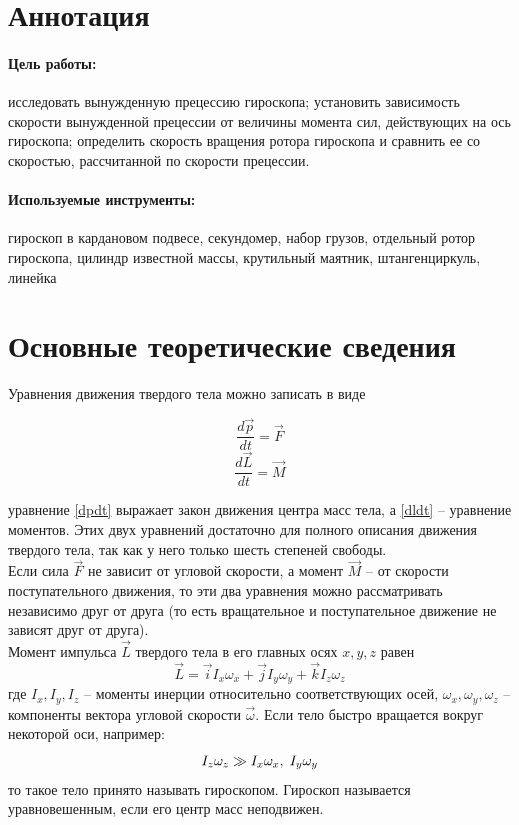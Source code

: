 \documentclass[a4paper,12pt]{article}
\begin{document}
	
	\newpage
	
	\section{Аннотация}
	\paragraph{Цель работы:} \hspace{-4mm} 
	исследовать вынужденную прецессию гироскопа; установить зависимость скорости вынужденной прецессии от величины момента сил, действующих на ось гироскопа; определить скорость вращения ротора гироскопа и сравнить ее со скоростью, рассчитанной по скорости прецессии.
	\paragraph{Используемые инструменты:} \hspace{-4mm} гироскоп в кардановом подвесе, секундомер, набор грузов, отдельный ротор гироскопа, цилиндр известной массы, крутильный маятник, штангенциркуль, линейка\\
	\section{Основные теоретические сведения}
	Уравнения движения твердого тела можно записать в виде
	
	\begin{equation}
		\label{dpdt}
		\frac{d\vec p}{dt}=\vec{F}
	\end{equation}
	\begin{equation}
		\label{dldt}
		\frac{d\vec{L}}{dt}=\vec{M}
	\end{equation}
	
	уравнение \eqref{dpdt} выражает закон движения центра масс тела, а \eqref{dldt} -- уравнение моментов. Этих двух уравнений достаточно для полного описания движения твердого тела, так как у него только шесть степеней свободы.\\
	
	Если сила $\vec{F}$ не зависит от угловой скорости, а момент $\vec{M}$ -- от скорости поступательного движения, то эти два уравнения можно рассматривать независимо друг от друга (то есть вращательное и поступательное движение не зависят друг от друга).\\
	
	Момент импульса $\vec{L}$ твердого тела в его главных осях $x,y,z$ равен
	\begin{equation}
		\label{L}
		\vec{L}=\vec{i}I_x\omega_x+\vec{j}I_y\omega_y+\vec{k}I_z\omega_z
	\end{equation}
	где $I_x, I_y, I_z$ -- моменты инерции относительно соответствующих осей, $\omega_x, \omega_y, \omega_z$ -- компоненты вектора угловой скорости $\vec{\omega}$. Если тело быстро вращается вокруг некоторой оси, например:
	\[
		I_z\omega_z \gg I_x\omega_x,\hspace{1mm} I_y\omega_y
	\]
	то такое тело принято называть гироскопом. Гироскоп называется уравновешенным, если его центр масс неподвижен.\\
	
\end{document}
